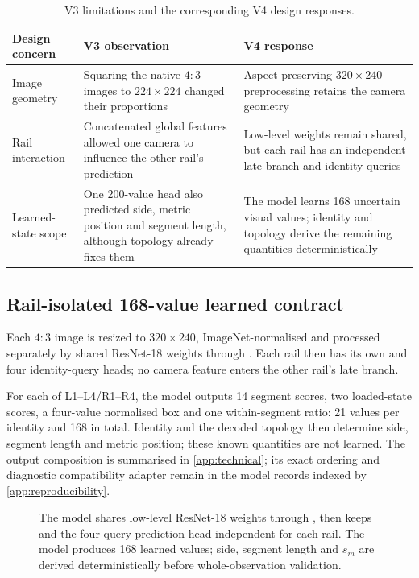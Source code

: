 \begin{table}[H]
\centering
\small
\renewcommand{\arraystretch}{1.08}
\caption{V3 limitations and the corresponding V4 design responses.}
\label{tab:v3-v4-design-response}
\begin{tabularx}{\textwidth}{@{}p{}p{}X@{}}
\toprule
\textbf{Design concern} & \textbf{V3 observation} & \textbf{V4 response}\\
\midrule
Image geometry & Squaring the native $4{:}3$ images to $224\times224$ changed
their proportions & Aspect-preserving $320\times240$ preprocessing retains the
camera geometry\\ \tablerowrule
Rail interaction & Concatenated global features allowed one camera to influence
the other rail's prediction & Low-level weights remain shared, but each rail has
an independent late branch and identity queries\\ \tablerowrule
Learned-state scope & One 200-value head also predicted side, metric position
and segment length, although topology already fixes them & The model learns 168
uncertain visual values; identity and topology derive the remaining quantities
deterministically\\
\bottomrule
\end{tabularx}
\end{table}

\subsection{Rail-isolated 168-value learned contract}

Each $4{:}3$ image is resized to $320\times240$, ImageNet-normalised and
processed separately by shared ResNet-18 weights through . Each
rail then has its own  and four identity-query heads; no camera
feature enters the other rail's late branch.

For each of L1--L4/R1--R4, the model outputs 14 segment scores, two loaded-state
scores, a four-value normalised box and one within-segment ratio: 21 values per
identity and 168 in total. Identity and the decoded topology then determine
side, segment length and metric position; these known quantities are not learned.
The output composition is summarised in \cref{app:technical}; its exact ordering
and diagnostic compatibility adapter remain in the model records indexed by
\cref{app:reproducibility}.

\begin{figure}[p]
  \centering
  
  \caption[Rail-isolated visual model and deterministic state derivation.]
  {The model shares low-level ResNet-18 weights through , then keeps
   and the four-query prediction head independent for each rail.
  The model produces 168 learned values; side, segment length and $s_m$ are
  derived deterministically before whole-observation validation.}
  \label{fig:visual-model-contract}
\end{figure}
\FloatBarrier

